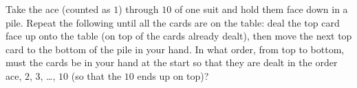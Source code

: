 Take the ace (counted as $1$) through $10$ of one suit and hold them face down in a pile. Repeat the following until all the cards are on the table: deal the top card face up onto the table (on top of the cards already dealt), then move the next top card to the bottom of the pile in your hand. In what order, from top to bottom, must the cards be in your hand at the start so that they are dealt in the order ace, $2$, $3$, \dots, $10$ (so that the $10$ ends up on top)?
